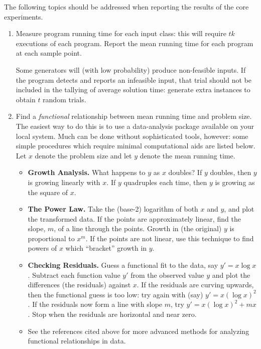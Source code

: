 The following topics should be addressed when reporting the results of
the core experiments.
\begin{enumerate} 
\item  Measure program running time for each input class: this will 
require $tk$ executions of each program.  Report the mean running time
for each program at each sample point.

Some generators will (with low probability) produce non-feasible
inputs. If the program detects and reports an infeasible input, that
trial should not be included in the tallying of average solution time:
generate extra instances to obtain $t$ random trials.

\item  Find a {\em functional} relationship between
mean running time and problem size.  The easiest way to do this is to
use a data-analysis package available on your local system.  Much can
be done without sophisticated tools, however: some simple procedures
which require minimal computational aids are listed below. Let $x$
denote the problem size and let $y$ denote the mean running time.
\begin{itemize}

\item {\bf Growth Analysis.}  What happens to $y$ as $x$ doubles?  
If $y$ doubles, then $y$ is growing linearly with $x$. If $y$
quadruples each time, then $y$ is growing as the square of $x$.

\item {\bf The Power Law.} 
Take the (base-2) logarithm of both $x$ and $y$, and plot the
transformed data.  If the points are approximately linear, find the
slope, $m$, of a line through the points.  Growth in (the original)
$y$ is proportional to $x^{m}$.  If the points are not linear, use
this technique to find powers of $x$ which ``bracket'' growth in $y$.

\item {\bf Checking Residuals.}  Guess a functional fit to the data, 
say $y' = x \log x$.  Subtract each function value $y'$ from the
observed value $y$ and plot the differences (the residuals) against
$x$.  If the residuals are curving upwards, then the functional guess
is too low: try again with (say) $y' = x (\log x)^2$.  If the
residuals now form a line with slope $m$, try $y' = x (\log x)^2 +
mx$.  Stop when the residuals are horizontal and near zero.

\item See the references cited above for more advanced 
methods for analyzing functional relationships in data.
\end{itemize}


\end{enumerate}
